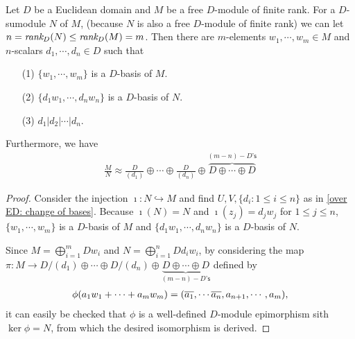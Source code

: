\begin{cor}\label{corollary over Z}
    Let $D$ be a Euclidean domain and $M$ be a free $D$-module of finite rank.
    For a $D$-sumodule $N$ of $M$, (because $N$ is also a free $D$-module of finite rank) we can let $n=\textit{rank}_D(N)\leq\textit{rank}_D(M)=m$.
    Then there are $m$-elements $w_1, \cdots, w_m\in M$ and $n$-scalars $d_1, \cdots, d_n\in D$ such that
    \begin{enumerate}
        \item[(1)]
        {
            $\{w_1, \cdots, w_m\}$ is a $D$-basis of $M$.
        }
        \item[(2)]
        {
            $\{d_1w_1, \cdots, d_nw_n\}$ is a $D$-basis of $N$.
        }
        \item[(3)]
        {
            $d_1|d_2|\cdots|d_n$.
        }
    \end{enumerate}
    Furthermore, we have
    \begin{align*}
        \frac{M}{N} \approx \frac{D}{(d_1)}\oplus\cdots\oplus \frac{D}{(d_n)}\oplus\overbrace{D\oplus\cdots\oplus D}^{(m-n)-D\textsf{'s}}
    \end{align*}
\end{cor}
\begin{proof}
    Consider the injection $\imath: N\hookrightarrow M$ and find $U, V, \{d_i: 1\leq i\leq n\}$ as in \cref{over ED: change of bases}.
    Because $\imath(N)=N$ and $\imath(z_j)=d_jw_j$ for $1\leq j\leq n$, $\{w_1, \cdots, w_m\}$ is a $D$-basis of $M$ and $\{d_1w_1, \cdots, d_nw_n\}$ is a $D$-basis of $N$.

    Since $M=\bigoplus_{i=1}^m Dw_i$ and $N=\bigoplus_{i=1}^n Dd_iw_i$, by considering the map $\pi: M\rightarrow D/(d_1)\oplus\cdots\oplus D/(d_n)\oplus\underbrace{D\oplus\cdots\oplus D}_{(m-n)-D\textsf{'s}}$ defined by
    \begin{align*}
        \phi(a_1w_1+\cdots+a_mw_m)=(\overline{a_1}, \cdots \overline{a_n}, a_{n+1}, \cdots, a_m),
    \end{align*}
    it can easily be checked that $\phi$ is a well-defined $D$-module epimorphism sith $\ker\phi=N$, from which the desired isomorphism is derived.
\end{proof}
